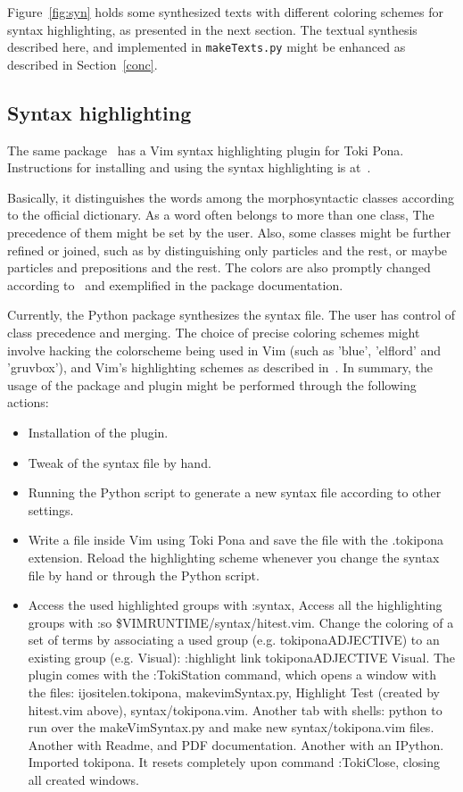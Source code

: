 \documentclass{article}
\newcommand{\tttt}[1]{\texttt{#1}}
\begin{document}
Figure~\ref{fig:syn} holds some synthesized texts
with different coloring schemes for syntax highlighting,
as presented in the next section.
The textual synthesis described here,
and implemented in \tttt{makeTexts.py}
might be enhanced as described in Section~\ref{conc}.

\subsection{Syntax highlighting}\label{shigh}
The same package~\cite{tokipona}
has a Vim syntax highlighting plugin
for Toki Pona.
Instructions for installing and using
the syntax highlighting is at~\cite{tokipona}.

Basically, it distinguishes the words among the morphosyntactic
classes according to the official dictionary.
As a word often belongs to more than one class,
The precedence of them might be set by the user.
Also, some classes might be further refined or joined,
such as by distinguishing only particles and the rest,
or maybe particles and prepositions and the rest.
The colors are also promptly changed according to~\cite{vimArt}
and exemplified in the package documentation.

Currently, the Python package synthesizes the
syntax file.
The user has control of class precedence and
merging.
The choice of precise coloring schemes
might involve hacking the colorscheme being
used in Vim (such as 'blue', 'elflord' and 'gruvbox'),
and Vim's highlighting schemes as described in~\cite{vimArt}.
In summary,
the usage of the package and plugin might be performed
through the following actions:
\begin{itemize}
  \item Installation of the plugin.
  \item Tweak of the syntax file by hand.
  \item Running the Python script to generate a new syntax file
    according to other settings.
  \item Write a file inside Vim using Toki Pona and save
    the file with the .tokipona extension.
    Reload the highlighting scheme whenever you
    change the syntax file by hand or through the Python script.
  \item Access the used highlighted groups with :syntax,
    Access all the highlighting groups with :so \$VIMRUNTIME/syntax/hitest.vim.
    Change the coloring of a set of terms by associating
    a used group (e.g. tokiponaADJECTIVE) to an existing group (e.g. Visual):
    :highlight link tokiponaADJECTIVE Visual.
    The plugin comes with the :TokiStation command, which opens a window with
    the files: ijositelen.tokipona, makevimSyntax.py, Highlight Test (created by hitest.vim above), syntax/tokipona.vim.
    Another tab with shells: python to run over the makeVimSyntax.py and make new syntax/tokipona.vim files. Another with Readme, and PDF documentation. Another with an IPython.
    Imported tokipona. It resets completely upon command :TokiClose, closing all created windows.
\end{itemize}
\end{document}
